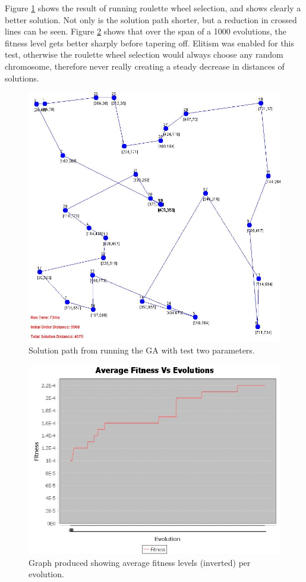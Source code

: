 \documentclass[article]{IEEEtran}
\begin{document}
Figure \ref{fig:16} shows the result of running roulette wheel selection, and shows clearly a better solution. Not only is the solution path shorter, but a reduction in crossed lines can be seen. Figure \ref{fig:17} shows that over the span of a 1000 evolutions, the fitness level gets better sharply before tapering off. Elitism was enabled for this test, otherwise the roulette wheel selection would always choose any random chromosome, therefore never really creating a steady decrease in distances of solutions.

\begin{figure}[H]
\centering
\includegraphics[width=.8\linewidth]{images/test2}
\caption{Solution path from running the GA with test two parameters.}
\label{fig:16}
\end{figure}

\begin{figure}[H]
\centering
\includegraphics[width=.8\linewidth]{images/averageFitnesses2}
\caption{Graph produced showing average fitness levels (inverted) per evolution.}
\label{fig:17}
\end{figure}
\end{document}
